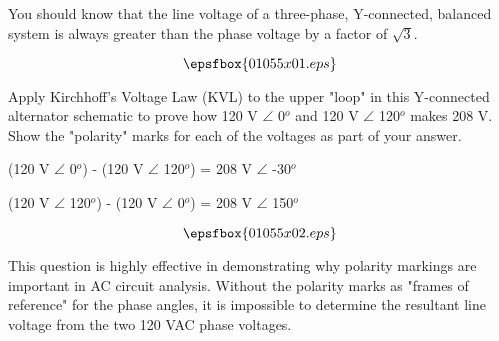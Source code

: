 

You should know that the line voltage of a three-phase, Y-connected, balanced system is always greater than the phase voltage by a factor of $\sqrt{3}$.

$$\epsfbox{01055x01.eps}$$

Apply Kirchhoff's Voltage Law (KVL) to the upper "loop" in this Y-connected alternator schematic to prove how 120 V $\angle$ 0$^{o}$ and 120 V $\angle$ 120$^{o}$ makes 208 V.  Show the "polarity" marks for each of the voltages as part of your answer.







(120 V $\angle$ 0$^{o}$) - (120 V $\angle$ 120$^{o}$) = 208 V $\angle$ -30$^{o}$ 

\vskip 10pt

(120 V $\angle$ 120$^{o}$) - (120 V $\angle$ 0$^{o}$) = 208 V $\angle$ 150$^{o}$ 

\vskip 10pt

$$\epsfbox{01055x02.eps}$$







This question is highly effective in demonstrating why polarity markings are important in AC circuit analysis.  Without the polarity marks as "frames of reference" for the phase angles, it is impossible to determine the resultant line voltage from the two 120 VAC phase voltages.



